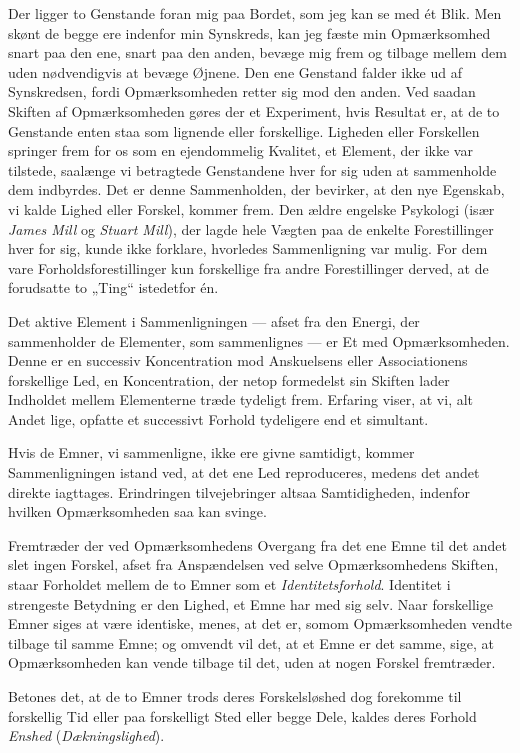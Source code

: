 \documentclass[12pt,a4paper]{book}
\newcommand{\apage}[1]{\marginnote{\footnotesize\textit{[#1]}}}
\begin{document}
Der ligger to Genstande foran mig paa Bordet, som jeg kan se med ét
Blik. Men skønt de begge ere indenfor min \apage{64} Synskreds, kan jeg fæste min
Opmærksomhed snart paa den ene, snart paa den anden, bevæge mig frem og
tilbage mellem dem uden nødvendigvis at bevæge Øjnene. Den ene Genstand
falder ikke ud af Synskredsen, fordi Opmærksomheden retter sig mod den
anden. Ved saadan Skiften af Opmærksomheden gøres der et Experiment,
hvis Resultat er, at de to Genstande enten staa som lignende eller
forskellige. Ligheden eller Forskellen springer frem for os som en
ejendommelig Kvalitet, et Element, der ikke var tilstede, saalænge vi
betragtede Genstandene hver for sig uden at sammenholde dem indbyrdes.
Det er denne Sammenholden, der bevirker, at den nye Egenskab, vi kalde
Lighed eller Forskel, kommer frem. Den ældre engelske Psykologi (især
\emph{James Mill} og \emph{Stuart Mill}), der lagde hele Vægten paa de
enkelte Forestillinger hver for sig, kunde ikke forklare, hvorledes
Sammenligning var mulig. For dem vare Forholdsforestillinger kun
forskellige fra andre Forestillinger derved, at de forudsatte to „Ting“
istedetfor én.

Det aktive Element i Sammenligningen --- afset fra den Energi, der
sammenholder de Elementer, som sammenlignes --- er Et med
Opmærksomheden. Denne er en successiv Koncentration mod Anskuelsens
eller Associationens forskellige Led, en Koncentration, der netop
formedelst sin Skiften lader Indholdet mellem Elementerne træde tydeligt
frem. Erfaring viser, at vi, alt Andet lige, opfatte et successivt
Forhold tydeligere end et simultant.

Hvis de Emner, vi sammenligne, ikke ere givne samtidigt, kommer
Sammenligningen istand ved, at det ene Led reproduceres, medens det
andet direkte iagttages. Erindringen tilvejebringer altsaa
Samtidigheden, indenfor hvilken Opmærksomheden saa kan svinge.

Fremtræder der ved Opmærksomhedens Overgang fra det ene Emne til det
andet slet ingen Forskel, afset fra Anspændelsen ved selve
Opmærksomhedens Skiften, staar Forholdet mellem de to Emner som et
\emph{Identitetsforhold}. Identitet i strengeste Betydning er den
Lighed, et Emne har med sig selv. Naar forskellige Emner siges at være
identiske, \apage{65} menes, at det er, somom Opmærksomheden vendte tilbage til
samme Emne; og omvendt vil det, at et Emne er det samme, sige, at
Opmærksomheden kan vende tilbage til det, uden at nogen Forskel
fremtræder.

Betones det, at de to Emner trods deres Forskelsløshed dog forekomme til
forskellig Tid eller paa forskelligt Sted eller begge Dele, kaldes deres
Forhold \emph{Enshed} (\emph{Dækningslighed}).
\end{document}
